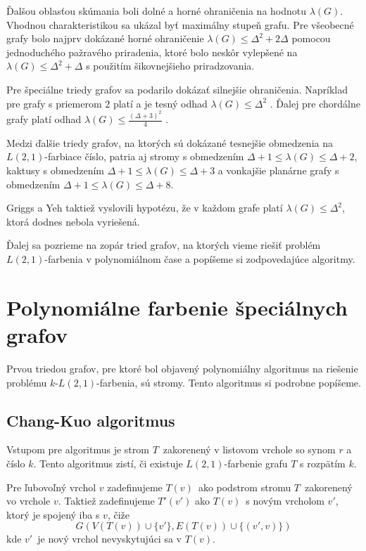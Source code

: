 Ďalšou oblasťou skúmania boli dolné a horné ohraničenia na hodnotu $\lambda(G)$.
Vhodnou charakteristikou sa ukázal byť maximálny stupeň grafu. Pre všeobecné
grafy bolo najprv dokázané horné ohraničenie $\lambda(G) \leq \Delta^2 + 2\Delta$
pomocou jednoduchého pažravého priradenia\cite{griggs_yeh_tree},
ktoré bolo neskôr vylepšené na $\lambda(G) \leq \Delta^2 + \Delta$ s použitím
šikovnejšieho priradzovania\cite{chang_kuo}.

Pre špeciálne triedy grafov sa podarilo dokázať silnejšie ohraničenia. Napríklad
pre grafy s priemerom $2$ platí a je tesný odhad $\lambda(G) \leq \Delta^2$\cite{griggs_yeh_tree}
. Ďalej pre chordálne grafy platí odhad $\lambda(G) \leq \frac{\left( \Delta + 3 \right)^2}{4}$\cite{griggs_yeh_tree}
.

Medzi ďalšie triedy grafov, na ktorých sú dokázané tesnejšie obmedzenia na $L(2,1)$-farbiace
číslo, patria aj stromy s obmedzením $\Delta + 1 \leq \lambda(G) \leq \Delta + 2$\cite{griggs_yeh_tree},
kaktusy s obmedzením $\Delta + 1 \leq \lambda(G) \leq \Delta + 3$\cite{kaktusy} a vonkajšie planárne
grafy s obmedzením $\Delta + 1 \leq \lambda(G) \leq \Delta + 8$\cite{outer_planar_bound}.

Griggs a Yeh taktiež vyslovili hypotézu, že v každom grafe platí $\lambda(G) \leq \Delta^2$,
ktorá dodnes nebola vyriešená.

Ďalej sa pozrieme na zopár tried grafov, na ktorých vieme riešiť problém $L(2,1)$-farbenia
v polynomiálnom čase a popíšeme si zodpovedajúce algoritmy.

\section{Polynomiálne farbenie špeciálnych grafov}

Prvou triedou grafov, pre ktoré bol objavený polynomiálny algoritmus na riešenie
problému $k$-$L(2,1)$-farbenia, sú stromy\cite{chang_kuo}. Tento algoritmus si
podrobne popíšeme.

\subsection{Chang-Kuo algoritmus}

Vstupom pre algoritmus je strom $T$ zakorenený v listovom vrchole so synom $r$ a číslo $k$.
Tento algoritmus zistí, či existuje $L(2,1)$-farbenie grafu $T$ s rozpätím $k$.

Pre ľubovoľný
vrchol $v$ zadefinujeme $T(v)$ ako podstrom stromu $T$ zakorenený vo vrchole $v$. Taktiež
zadefinujeme $T'(v')$ ako $T(v)$ s novým vrcholom $v'$, ktorý je spojený iba s $v$, čiže
$$ G\left(V(T(v)) \cup \{ v' \}, E(T(v)) \cup \{ (v', v)\} \right) $$
kde $v'$ je nový vrchol nevyskytujúci sa v $T(v)$.

